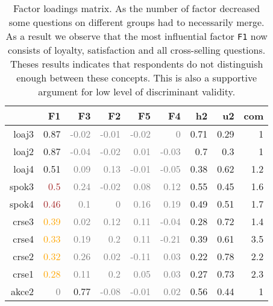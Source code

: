 \documentclass[10pt,a4paper]{article}
\begin{document}
\begin{table}[htbp]
  \centering
  \caption{Factor loadings matrix. As the number of factor decreased some questions on different groups had to necessarily merge. As a result we observe that the most influential factor \texttt{F1} now consists of loyalty, satisfaction and all cross-selling questions. Theses results indicates that respondents do not distinguish enough between these concepts. This is also a supportive argument for low level of discriminant validity.}
    \begin{tabular}{r|rrrrrrrr}
          & F1   & F3   & F2   & F5   & F4   & h2    & u2    & com \\\hline
    loaj3 & \textcolor{NavyBlue}{0.87} & \textcolor{Gray}{-0.02} & \textcolor{Gray}{-0.01} & \textcolor{Gray}{-0.02} & \textcolor{Gray}{0} & 0.71  & 0.29  & 1 \\
    loaj2 & \textcolor{NavyBlue}{0.87} & \textcolor{Gray}{-0.04} & \textcolor{Gray}{-0.02} & \textcolor{Gray}{0.01} & \textcolor{Gray}{-0.03} & 0.7   & 0.3   & 1 \\
    loaj4 & \textcolor{NavyBlue}{0.51} & \textcolor{Gray}{0.09} & \textcolor{Gray}{0.13} & \textcolor{Gray}{-0.01} & \textcolor{Gray}{-0.05} & 0.38  & 0.62  & 1.2 \\
    spok3 & \textcolor{Brown}{0.5} & \textcolor{Gray}{0.24} & \textcolor{Gray}{-0.02} & \textcolor{Gray}{0.08} & \textcolor{Gray}{0.12} & 0.55  & 0.45  & 1.6 \\
    spok4 & \textcolor{Brown}{0.46} & \textcolor{Gray}{0.1} & \textcolor{Gray}{0} & \textcolor{Gray}{0.16} & \textcolor{Gray}{0.19} & 0.49  & 0.51  & 1.7 \\
    crse3 & \textcolor{Orange}{0.39} & \textcolor{Gray}{0.02} & \textcolor{Gray}{0.12} & \textcolor{Gray}{0.11} & \textcolor{Gray}{-0.04} & 0.28  & 0.72  & 1.4 \\
    crse4 & \textcolor{Orange}{0.33} & \textcolor{Gray}{0.19} & \textcolor{Gray}{0.2} & \textcolor{Gray}{0.11} & \textcolor{Gray}{-0.21} & 0.39  & 0.61  & 3.5 \\
    crse2 & \textcolor{Orange}{0.32} & \textcolor{Gray}{0.26} & \textcolor{Gray}{0.02} & \textcolor{Gray}{-0.11} & \textcolor{Gray}{0.03} & 0.22  & 0.78  & 2.2 \\
    crse1 & \textcolor{Orange}{0.28} & \textcolor{Gray}{0.11} & \textcolor{Gray}{0.2} & \textcolor{Gray}{0.05} & \textcolor{Gray}{0.03} & 0.27  & 0.73  & 2.3 \\
    akce2 & \textcolor{Gray}{0} & \textcolor{NavyBlue}{0.77} & \textcolor{Gray}{-0.08} & \textcolor{Gray}{-0.01} & \textcolor{Gray}{0.02} & 0.56  & 0.44  & 1 \\

\end{tabular}
\end{table}
\end{document}
